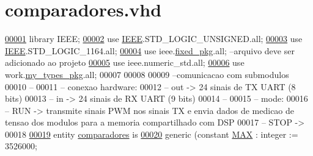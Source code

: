 \hypertarget{comparadores_8vhd_source}{}\section{comparadores.\+vhd}

\begin{DoxyCode}
\hypertarget{comparadores_8vhd_source_l00001}{}\hyperlink{classcomparadores_ae4f03c286607f3181e16b9aa12d0c6d4}{00001} \textcolor{vhdlkeyword}{library }\textcolor{keywordflow}{IEEE};
\hypertarget{comparadores_8vhd_source_l00002}{}\hyperlink{classcomparadores_a241c3e72dd8024cc8ae831b1b2aed7db}{00002} \textcolor{vhdlkeyword}{use }\hyperlink{classcomparador_ae4f03c286607f3181e16b9aa12d0c6d4}{IEEE}.STD\_LOGIC\_UNSIGNED.\textcolor{keywordflow}{all};
\hypertarget{comparadores_8vhd_source_l00003}{}\hyperlink{classcomparadores_aa4b2b25246a821511120e3149b003563}{00003} \textcolor{vhdlkeyword}{use }\hyperlink{classcomparador_ae4f03c286607f3181e16b9aa12d0c6d4}{IEEE}.STD\_LOGIC\_1164.\textcolor{keywordflow}{all};
\hypertarget{comparadores_8vhd_source_l00004}{}\hyperlink{classcomparadores_aad86249c80e8c1e7ee1c4748aba748e3}{00004} \textcolor{vhdlkeyword}{use }ieee.\hyperlink{classfixed__pkg}{fixed\_pkg}.\textcolor{keywordflow}{all};\textcolor{keyword}{         --arquivo deve ser adicionado ao projeto  }
\hypertarget{comparadores_8vhd_source_l00005}{}\hyperlink{classcomparadores_a2edc34402b573437d5f25fa90ba4013e}{00005} \textcolor{vhdlkeyword}{use }ieee.numeric\_std.\textcolor{keywordflow}{all};
\hypertarget{comparadores_8vhd_source_l00006}{}\hyperlink{classcomparadores_ac1788a894930eeee5aaed06b4775d746}{00006} \textcolor{vhdlkeyword}{use }work.\hyperlink{classmy__types__pkg}{my\_types\_pkg}.\textcolor{keywordflow}{all};
00007 
00008 
00009 \textcolor{keyword}{--comunicacao com submodulos}
00010 \textcolor{keyword}{--}
00011 \textcolor{keyword}{-- conexao hardware:}
00012 \textcolor{keyword}{--   out -> 24 sinais de TX UART (8 bits)}
00013 \textcolor{keyword}{--   in  -> 24 sinais de RX UART (9 bits)}
00014 \textcolor{keyword}{--}
00015 \textcolor{keyword}{-- mode:}
00016 \textcolor{keyword}{--   RUN   -> transmite sinais PWM nos sinais TX e envia dados de medicao de tensao dos modulos para a
       memoria compartilhado com DSP}
00017 \textcolor{keyword}{--    STOP  ->}
00018 
\hypertarget{comparadores_8vhd_source_l00019}{}\hyperlink{classcomparadores}{00019} \textcolor{keywordflow}{entity }\hyperlink{classcomparadores}{comparadores} \textcolor{keywordflow}{is}
\hypertarget{comparadores_8vhd_source_l00020}{}\hyperlink{classcomparadores_a601f7f505b21fa95d9d2e36075d21041}{00020} \textcolor{keywordflow}{generic}  \textcolor{vhdlchar}{(}\textcolor{keywordflow}{constant} \textcolor{vhdlchar}{\hyperlink{classcomparadores_a601f7f505b21fa95d9d2e36075d21041}{MAX}} \textcolor{vhdlchar}{:} \textcolor{comment}{integer} \textcolor{vhdlchar}{:=} \textcolor{vhdllogic}{}\textcolor{vhdllogic}{3526000};

\end{DoxyCode}
